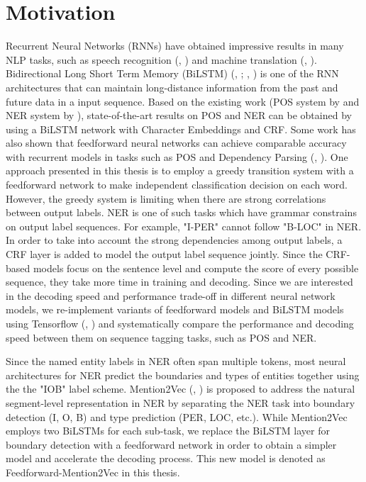 \section{Motivation}
Recurrent Neural Networks (RNNs) have obtained impressive results in many NLP tasks, such as speech recognition (\citeauthor{graves2013speech}, \citeyear{graves2013speech}) and machine translation (\citeauthor{cho2014properties}, \citeyear{cho2014properties}).
Bidirectional Long Short Term Memory (BiLSTM) (\citeauthor{Hochreiter97longshort-term}, \citeyear{Hochreiter97longshort-term}; \citeauthor{graves2005framewise}, \citeyear{graves2005framewise}) is one of the RNN architectures that can maintain long-distance information from the past and future data in a input sequence. Based on the existing work (POS system by \cite{ling2015finding} and NER system by \cite{lample2016neural}), state-of-the-art results on POS and NER can be obtained by using a BiLSTM network with Character Embeddings and CRF. Some work has also shown that feedforward neural networks can achieve comparable accuracy with recurrent models in tasks such as POS and Dependency Parsing (\citeauthor{andor2016globally}, \citeyear{andor2016globally}). One approach presented in this thesis is to employ a greedy transition system with a feedforward network to make independent classification decision on each word. However, the greedy system is limiting when there are strong correlations between output labels. NER is one of such tasks which have grammar constrains on output label sequences. For example, "I-PER" cannot follow "B-LOC" in NER. In order to take into account the strong dependencies among output labels, a CRF layer is added to model the output label sequence jointly. Since the CRF-based models focus on the sentence level and compute the score of every possible sequence, they take more time in training and decoding. Since we are interested in the decoding speed and performance trade-off in different neural network models, we re-implement variants of feedforward models and BiLSTM models using Tensorflow (\citeauthor{abadi2016tensorflow}, \citeyear{abadi2016tensorflow}) and systematically compare the performance and decoding speed between them on sequence tagging tasks, such as POS and NER.

Since the named entity labels in NER often span multiple tokens, most neural architectures for NER predict the boundaries and types of entities together using the the "IOB" label scheme. Mention2Vec (\citeauthor{stratos2016mention2vec}, \citeyear{stratos2016mention2vec}) is proposed to address the natural segment-level representation in NER by separating the NER task into boundary detection (I, O, B) and type prediction (PER, LOC, etc.). While Mention2Vec employs two BiLSTMs for each sub-task, we replace the BiLSTM layer for boundary detection with a feedforward network in order to obtain a simpler model and accelerate the decoding process. This new model is denoted as Feedforward-Mention2Vec in this thesis.

